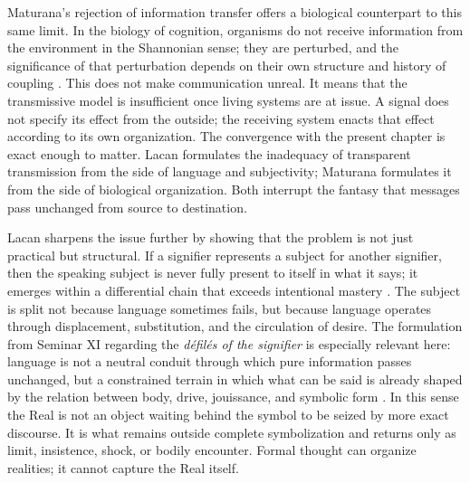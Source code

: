 Maturana's rejection of information transfer offers a biological counterpart to this same limit. In the biology of cognition, organisms do not receive information from the environment in the Shannonian sense; they are perturbed, and the significance of that perturbation depends on their own structure and history of coupling \parencite{maturana_1970, maturana_varela_1987}. This does not make communication unreal. It means that the transmissive model is insufficient once living systems are at issue. A signal does not specify its effect from the outside; the receiving system enacts that effect according to its own organization. The convergence with the present chapter is exact enough to matter. Lacan formulates the inadequacy of transparent transmission from the side of language and subjectivity; Maturana formulates it from the side of biological organization. Both interrupt the fantasy that messages pass unchanged from source to destination.

Lacan sharpens the issue further by showing that the problem is not just practical but structural. If a signifier represents a subject for another signifier, then the speaking subject is never fully present to itself in what it says; it emerges within a differential chain that exceeds intentional mastery \parencite{lacan_1966, lacan_1973, lacan_1975}. The subject is split not because language sometimes fails, but because language operates through displacement, substitution, and the circulation of desire. The formulation from Seminar XI regarding the \emph{d\'efil\'es of the signifier} is especially relevant here: language is not a neutral conduit through which pure information passes unchanged, but a constrained terrain in which what can be said is already shaped by the relation between body, drive, jouissance, and symbolic form \parencite{lacan_1973}. In this sense the Real is not an object waiting behind the symbol to be seized by more exact discourse. It is what remains outside complete symbolization and returns only as limit, insistence, shock, or bodily encounter. Formal thought can organize realities; it cannot capture the Real itself.


